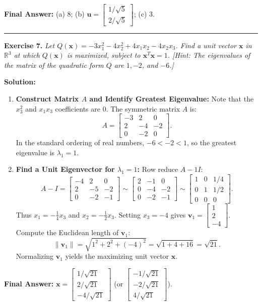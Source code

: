 \documentclass[11pt, letterpaper]{article}
\theoremstyle{definition}
\theoremstyle{remark}
\begin{document}
\textbf{Final Answer:} (a) $8$; \quad (b) $\mathbf{u} = \begin{bmatrix} 1/\sqrt{5} \\ 2/\sqrt{5} \end{bmatrix}$; \quad (c) $3$.

\medskip
\hrule
\medskip

\textbf{Exercise 7.} \emph{Let $Q(\mathbf{x}) = -3x_1^2 - 4x_2^2 + 4x_1x_2 - 4x_2x_3$. Find a unit vector $\mathbf{x}$ in $\mathbb{R}^3$ at which $Q(\mathbf{x})$ is maximized, subject to $\mathbf{x}^T\mathbf{x} = 1$. [Hint: The eigenvalues of the matrix of the quadratic form $Q$ are $1, -2$, and $-6$.]}

\textbf{Solution:}
\begin{enumerate}[label=\textbf{Step \arabic*:}]
    \item \textbf{Construct Matrix $A$ and Identify Greatest Eigenvalue:}
    Note that the $x_3^2$ and $x_1x_3$ coefficients are $0$. The symmetric matrix $A$ is:
    \[
    A = \begin{bmatrix} -3 & 2 & 0 \\ 2 & -4 & -2 \\ 0 & -2 & 0 \end{bmatrix}.
    \]
    In the standard ordering of real numbers, $-6 < -2 < 1$, so the greatest eigenvalue is $\lambda_1 = 1$.
    \item \textbf{Find a Unit Eigenvector for $\lambda_1 = 1$:}
    Row reduce $A - 1I$:
    \[
    A - I = \begin{bmatrix} -4 & 2 & 0 \\ 2 & -5 & -2 \\ 0 & -2 & -1 \end{bmatrix} \sim \begin{bmatrix} 2 & -1 & 0 \\ 0 & -4 & -2 \\ 0 & -2 & -1 \end{bmatrix} \sim \begin{bmatrix} 1 & 0 & 1/4 \\ 0 & 1 & 1/2 \\ 0 & 0 & 0 \end{bmatrix}.
    \]
    Thus $x_1 = -\frac{1}{4}x_3$ and $x_2 = -\frac{1}{2}x_3$. Setting $x_3 = -4$ gives $\mathbf{v}_1 = \begin{bmatrix} 1 \\ 2 \\ -4 \end{bmatrix}$.
    Compute the Euclidean length of $\mathbf{v}_1$:
    \[
    \|\mathbf{v}_1\| = \sqrt{1^2 + 2^2 + (-4)^2} = \sqrt{1 + 4 + 16} = \sqrt{21}.
    \]
    Normalizing $\mathbf{v}_1$ yields the maximizing unit vector $\mathbf{x}$.
\end{enumerate}
\textbf{Final Answer:} $\mathbf{x} = \begin{bmatrix} 1/\sqrt{21} \\ 2/\sqrt{21} \\ -4/\sqrt{21} \end{bmatrix}$ (or $\begin{bmatrix} -1/\sqrt{21} \\ -2/\sqrt{21} \\ 4/\sqrt{21} \end{bmatrix}$).
\end{document}
